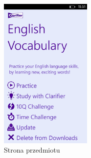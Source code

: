 \documentclass{pracamgr}
\begin{document}
\begin{figure}[h!]
    \centering
    \includegraphics[width=0.4\textwidth]{Course.png}
    \caption{Strona przedmiotu}
    \label{fig:course}
\end{figure}
\end{document}
